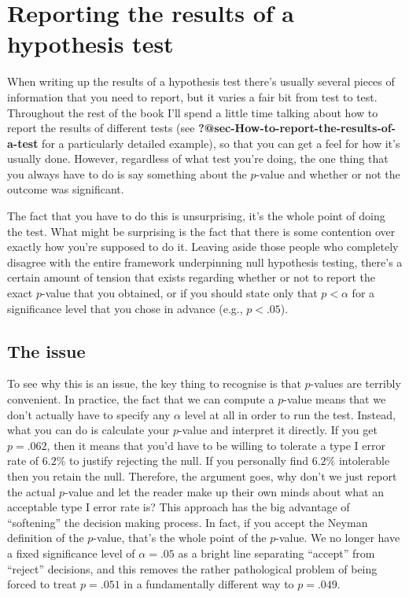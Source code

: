 \documentclass[
  a4paper,
]{book}
\begin{document}
\section{Reporting the results of a hypothesis
test}\label{reporting-the-results-of-a-hypothesis-test}

When writing up the results of a hypothesis test there's usually several
pieces of information that you need to report, but it varies a fair bit
from test to test. Throughout the rest of the book I'll spend a little
time talking about how to report the results of different tests (see
\textbf{?@sec-How-to-report-the-results-of-a-test} for a particularly
detailed example), so that you can get a feel for how it's usually done.
However, regardless of what test you're doing, the one thing that you
always have to do is say something about the \(p\)-value and whether or
not the outcome was significant.

The fact that you have to do this is unsurprising, it's the whole point
of doing the test. What might be surprising is the fact that there is
some contention over exactly how you're supposed to do it. Leaving aside
those people who completely disagree with the entire framework
underpinning null hypothesis testing, there's a certain amount of
tension that exists regarding whether or not to report the exact
\(p\)-value that you obtained, or if you should state only that
\(p < \alpha\) for a significance level that you chose in advance (e.g.,
\(p < .05\)).

\subsection{The issue}\label{the-issue}

To see why this is an issue, the key thing to recognise is that
\(p\)-values are terribly convenient. In practice, the fact that we can
compute a \(p\)-value means that we don't actually have to specify any
\(\alpha\) level at all in order to run the test. Instead, what you can
do is calculate your \(p\)-value and interpret it directly. If you get
\(p = .062\), then it means that you'd have to be willing to tolerate a
type I error rate of \(6.2\%\) to justify rejecting the null. If you
personally find \(6.2\%\) intolerable then you retain the null.
Therefore, the argument goes, why don't we just report the actual
\(p\)-value and let the reader make up their own minds about what an
acceptable type I error rate is? This approach has the big advantage of
``softening'' the decision making process. In fact, if you accept the
Neyman definition of the \(p\)-value, that's the whole point of the
\(p\)-value. We no longer have a fixed significance level of
\(\alpha = .05\) as a bright line separating ``accept'' from ``reject''
decisions, and this removes the rather pathological problem of being
forced to treat \(p = .051\) in a fundamentally different way to
\(p = .049\).
\end{document}
